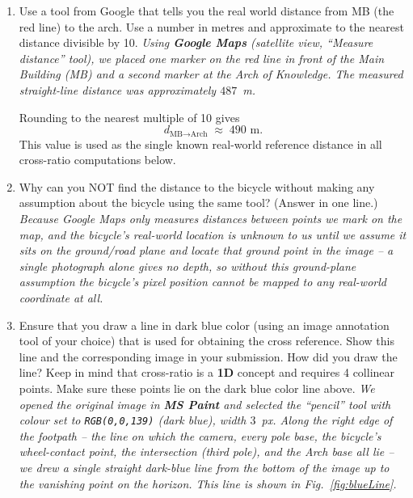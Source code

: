 \documentclass[11pt]{article}
\newenvironment{studentSpace}{\itshape}{}
\begin{document}
\begin{enumerate}
\item Use a tool from Google that tells you the real world distance from MB (the red line) to the arch.  Use a number in metres and approximate to the nearest distance divisible by 10. 
\begin{studentSpace}
Using \textbf{Google Maps} (satellite view, ``Measure distance'' tool),
we placed one marker on the red line in front of the Main Building
(MB) and a second marker at the Arch of Knowledge. The measured
straight-line distance was approximately $487$~m.

Rounding to the nearest multiple of 10 gives
\[
  d_{\text{MB}\to\text{Arch}} \;\approx\; \boxed{490 \text{ m}}.
\]
This value is used as the single known real-world reference distance
in all cross-ratio computations below.
\end{studentSpace}

\item Why can you NOT find the distance to the bicycle without making any assumption about the bicycle using the same tool? (Answer in one line.)
\begin{studentSpace}
Because Google Maps only measures distances between points we mark
\emph{on the map}, and the bicycle's real-world location is unknown to
us until we \emph{assume} it sits on the ground/road plane and locate
that ground point in the image -- a single photograph alone gives no
depth, so without this ground-plane assumption the bicycle's pixel
position cannot be mapped to any real-world coordinate at all.
\end{studentSpace}

\item Ensure that you draw a line in dark blue color (using an image annotation tool of your choice) that is used for obtaining the cross reference.  Show this line and the corresponding image in your submission. How did you draw the line? Keep in mind that cross-ratio is a \textbf{1D} concept and requires 4 collinear points. Make sure these points lie on the dark blue color line above.
\begin{studentSpace}
We opened the original image in \textbf{MS Paint} and selected the
``pencil'' tool with colour set to \texttt{RGB(0,0,139)} (dark blue),
width $3$~px. Along the right edge of the footpath -- the line on
which the camera, every pole base, the bicycle's wheel-contact point,
the intersection (third pole), and the Arch base all lie -- we drew a
single straight dark-blue line from the bottom of the image up to the
vanishing point on the horizon. This line is shown in
Fig.~\ref{fig:blueLine}.


\end{studentSpace}
\end{enumerate}
\end{document}
